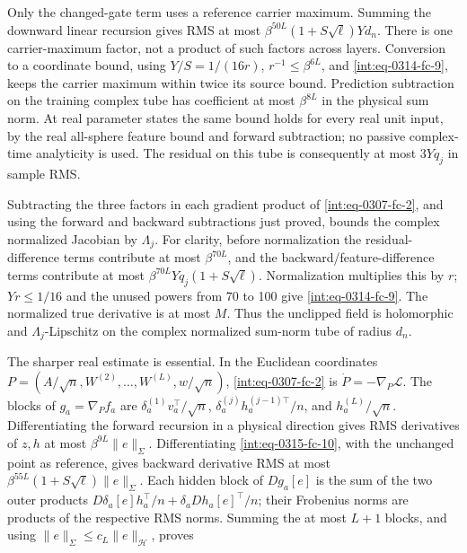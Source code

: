 
Only the changed-gate term uses a reference carrier maximum. Summing the downward linear recursion gives RMS at most \(\beta^{50L}(1+S\sqrt\ell)Yd_n\). There is one carrier-maximum factor, not a product of such factors across layers. Conversion to a coordinate bound, using \(Y/S=1/(16r)\), \(r^{-1}\le\beta^{6L}\), and \eqref{int:eq-0314-fc-9}, keeps the carrier maximum within twice its source bound. Prediction subtraction on the training complex tube has coefficient at most \(\beta^{8L}\) in the physical sum norm. At real parameter states the same bound holds for every real unit input, by the real all-sphere feature bound and forward subtraction; no passive complex-time analyticity is used. The residual on this tube is consequently at most \(3Yq_j\) in sample RMS.



Subtracting the three factors in each gradient product of \eqref{int:eq-0307-fc-2}, and using the forward and backward subtractions just proved, bounds the complex normalized Jacobian by \(\Lambda_j\). For clarity, before normalization the residual-difference terms contribute at most \(\beta^{70L}\), and the backward/feature-difference terms contribute at most \(\beta^{70L}Yq_j(1+S\sqrt\ell)\). Normalization multiplies this by \(r\); \(Yr\le1/16\) and the unused powers from 70 to 100 give \eqref{int:eq-0314-fc-9}. The normalized true derivative is at most \(M\). Thus the unclipped field is holomorphic and \(\Lambda_j\)-Lipschitz on the complex normalized sum-norm tube of radius \(d_n\).



The sharper real estimate is essential. In the Euclidean coordinates \(P=(A/\sqrt n,\allowbreak W^{(2)},\allowbreak \ldots,\allowbreak W^{(L)},\allowbreak w/\sqrt n)\), \eqref{int:eq-0307-fc-2} is \(\dot P=-\nabla_P\mathcal L\). The blocks of \(g_a=\nabla_Pf_a\) are \(\delta_a^{(1)}v_a^\top/\sqrt n\), \(\delta_a^{(j)}h_a^{(j-1)\top}/n\), and \(h_a^{(L)}/\sqrt n\). Differentiating the forward recursion in a physical direction gives RMS derivatives of \(z,\allowbreak h\) at most \(\beta^{9L}\|e\|_\Sigma\). Differentiating \eqref{int:eq-0315-fc-10}, with the unchanged point as reference, gives backward derivative RMS at most \(\beta^{55L}(1+S\sqrt\ell)\|e\|_\Sigma\). Each hidden block of \(Dg_a[e]\) is the sum of the two outer products \(D\delta_a[e]h_a^\top/n+\delta_a Dh_a[e]^\top/n\); their Frobenius norms are products of the respective RMS norms. Summing the at most \(L+1\) blocks, and using \(\|e\|_\Sigma\le c_L\|e\|_{ \mathcal H}\), proves


